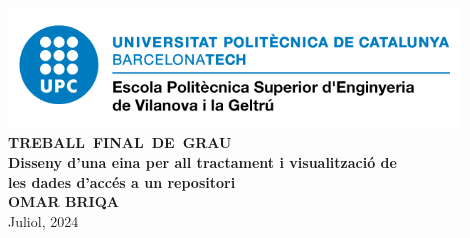 \begin{titlepage}
    \begin{center}

        \vspace*{-3cm}
        \includegraphics[width=0.9\textwidth]{figures/epsevg-logo} \\ [1cm]

        \Huge
        \vspace{1cm}
        \textbf{\mbox{TREBALL FINAL DE GRAU}} \\ [3cm]

        \Huge
        \textbf{Disseny d'una eina per all tractament i visualització de \\ les dades d'accés a un repositori} \\ [2cm]

        \huge
        \textbf{OMAR BRIQA} \\ [3cm]
        Juliol, 2024

    \end{center}
\end{titlepage}

